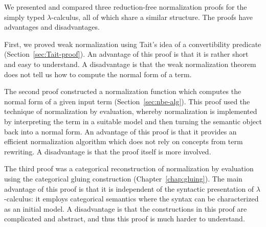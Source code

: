\begin{comment}
\begin{itemize}
    \item Give a short summary of what I did:
    \begin{itemize}
        \item I presented and compared 3 normalization proofs: Tait, NbE, gluing
        \item On the way introduction to the model theory lambda calculus: Henkin models, Kripke models, simply typed categories with families
    \end{itemize}
    \item Future work
    \begin{itemize}
        \item generalize NbE and gluing in the same way I generalized Tait
        \item Consider more complex type theories (e.g. dependent types, inductive types)
    \end{itemize}
\end{itemize}
\end{comment}

We presented and compared three reduction-free normalization proofs for the simply typed $\lambda$-calculus, all of which share a similar structure. The proofs have advantages and disadvantages.
\begin{enum}
    \item First, we proved weak normalization using Tait's idea of a convertibility predicate (Section~\ref{sec:Tait-proof}). An advantage of this proof is that it is rather short and easy to understand. A disadvantage is that the weak normalization theorem does not tell us how to compute the normal form of a term.
    \item The second proof constructed a normalization function which computes the normal form of a given input term (Section~\ref{sec:nbe-alg}). This proof used the technique of normalization by evaluation, whereby normalization is implemented by interpreting the term in a suitable model and then turning the semantic object back into a normal form. An advantage of this proof is that it provides an efficient normalization algorithm which does not rely on concepts from term rewriting. A disadvantage is that the proof itself is more involved.
    \item The third proof was a categorical reconstruction of normalization by evaluation using the categorical gluing construction (Chapter~\ref{chap:gluing}). The main advantage of this proof is that it is independent of the syntactic presentation of $\lambda$-calculus: it employs categorical semantics where the syntax can be characterized as an initial model. A disadvantage is that the constructions in this proof are complicated and abstract, and thus this proof is much harder to understand.
\end{enum}

